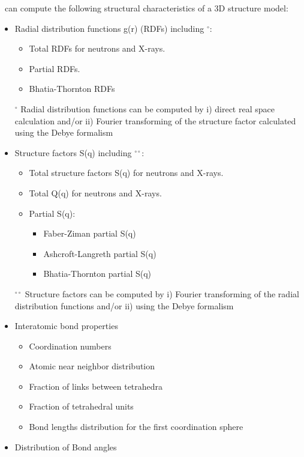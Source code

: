 \atomes\ can compute the following structural characteristics of a 3D structure model:
{\small{
\begin{itemize}
\item Radial distribution functions g(r) (RDFs) \cite{AlTilde} including $^{\circ}$:
\begin{itemize}
\item Total RDFs for neutrons and X-rays.
\item Partial RDFs.
\item Bhatia-Thornton RDFs \cite{2007JNCS..353.2959S}
\end{itemize}
$^{\circ}$ Radial distribution functions can be computed by i) direct real space calculation and/or ii) Fourier transforming of the structure factor calculated using the Debye formalism \cite{EurJM.14-233.2002}
\item Structure factors S(q) \cite{EurJM.14-233.2002} including $^{\circ\circ}$:
\begin{itemize}
\item Total structure factors S(q) for neutrons and X-rays.
\item Total Q(q) \cite{EurJM.14-233.2002,jac.17-61.1984} for neutrons and X-rays.
\item Partial S(q):
\begin{itemize}
\item Faber-Ziman \cite{PhilMag.11.153} partial S(q)
\item Ashcroft-Langreth \cite{PhysRev.156.685,PhysRev.159.500,PhysRev.166.934.2} partial S(q)
\item Bhatia-Thornton \cite{PhysRevB.2.3004} partial S(q)
\end{itemize}
\end{itemize}
$^{\circ\circ}$ Structure factors can be computed by i) Fourier transforming of the radial distribution functions and/or ii) using the Debye formalism \cite{EurJM.14-233.2002}
\item Interatomic bond properties
\begin{itemize}
\item Coordination numbers
\item Atomic near neighbor distribution
\item Fraction of links between tetrahedra
\item Fraction of tetrahedral units
\item Bond lengths distribution for the first coordination sphere
\end{itemize}
\item Distribution of Bond angles

\end{itemize}}}
